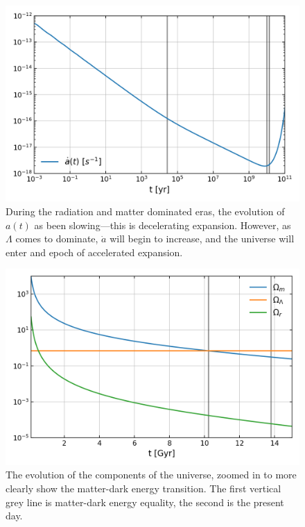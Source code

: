 \begin{figure}[!pth]
\centering     %
    \includegraphics[width=.75\columnwidth]{plots/lcdm_adot.png}
\caption{
    During the radiation and matter dominated eras, the evolution of
    $a(t)$ as been slowing---this is decelerating expansion.
    However, as $\Lambda$ comes to dominate,
    $\dot{a}$ will begin to increase, and the universe will enter
    and epoch of accelerated expansion.
}\label{fig:lcdm_adot}
\end{figure}
\begin{figure}[!pth]
\centering     %
    \includegraphics[width=.75\columnwidth]{plots/lcdm_components_linear.png}
\caption{
    The evolution of the components of the universe, zoomed in to more clearly
    show the matter-dark energy transition. The first vertical grey line is
    matter-dark energy equality, the second is the present day.
}\label{fig:lcdm_components_linear}
\end{figure}
